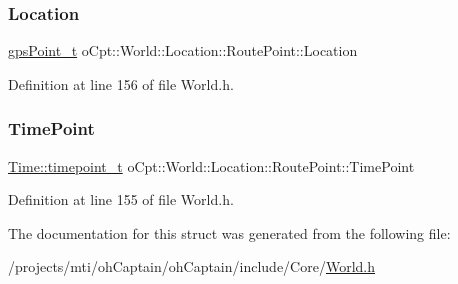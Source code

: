 \subsubsection{\texorpdfstring{Location}{Location}}
{\footnotesize\ttfamily \hyperlink{classo_cpt_1_1_world_1_1_location_a3aa5e31e2888b4da40ad534b99473888}{gps\+Point\+\_\+t} o\+Cpt\+::\+World\+::\+Location\+::\+Route\+Point\+::\+Location}



Definition at line 156 of file World.\+h.

\hypertarget{structo_cpt_1_1_world_1_1_location_1_1_route_point_ab1843ea5bc2555a1258f15578198fb3d}{}\label{structo_cpt_1_1_world_1_1_location_1_1_route_point_ab1843ea5bc2555a1258f15578198fb3d} 
\subsubsection{\texorpdfstring{Time\+Point}{TimePoint}}
{\footnotesize\ttfamily \hyperlink{classo_cpt_1_1_world_1_1_time_a6a6e782c3c90622c1c7070b0a223ec4c}{Time\+::timepoint\+\_\+t} o\+Cpt\+::\+World\+::\+Location\+::\+Route\+Point\+::\+Time\+Point}



Definition at line 155 of file World.\+h.



The documentation for this struct was generated from the following file\+:\begin{DoxyCompactItemize}
\item 
/projects/mti/oh\+Captain/oh\+Captain/include/\+Core/\hyperlink{_world_8h}{World.\+h}\end{DoxyCompactItemize}
